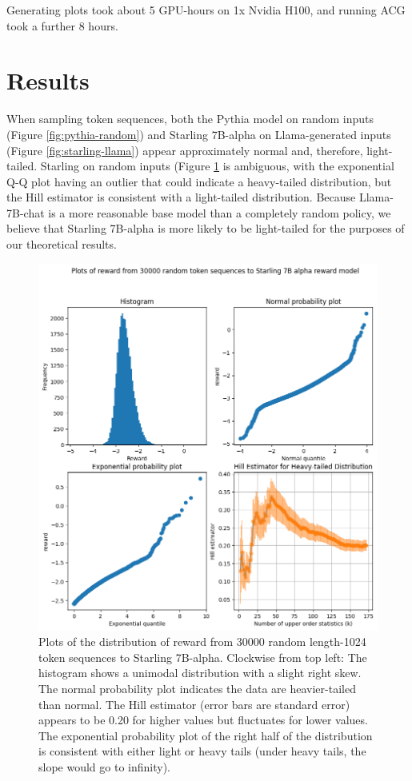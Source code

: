 \documentclass{article}
\theoremstyle{plain}
\theoremstyle{definition}
\theoremstyle{remark}
\begin{document}
Generating plots took about 5 GPU-hours on 1x Nvidia H100, and running ACG took a further 8 hours.

\section{Results\label{sec:experiments}}

When sampling token sequences, both the Pythia model on random inputs (Figure \ref{fig:pythia-random}) and Starling 7B-alpha on Llama-generated inputs (Figure \ref{fig:starling-llama}) appear approximately normal and, therefore, light-tailed. Starling on random inputs (Figure \ref{fig:starling-random} is ambiguous, with the exponential Q-Q plot having an outlier that could indicate a heavy-tailed distribution, but the Hill estimator is consistent with a light-tailed distribution. Because Llama-7B-chat is a more reasonable base model than a completely random policy, we believe that Starling 7B-alpha is more likely to be light-tailed for the purposes of our theoretical results.

\begin{figure}
    \centering
    \includegraphics[width=0.8\linewidth]{images/reward_plots_random_starling_30k_se.png}
    \caption{Plots of the distribution of reward from 30000 random length-1024 token sequences to Starling 7B-alpha. Clockwise from top left: The histogram shows a unimodal distribution with a slight right skew. The normal probability plot indicates the data are heavier-tailed than normal. The Hill estimator (error bars are standard error) appears to be 0.20 for higher values but fluctuates for lower values. The exponential probability plot of the right half of the distribution is consistent with either light or heavy tails (under heavy tails, the slope would go to infinity).}
    \label{fig:starling-random}
\end{figure}
\end{document}
